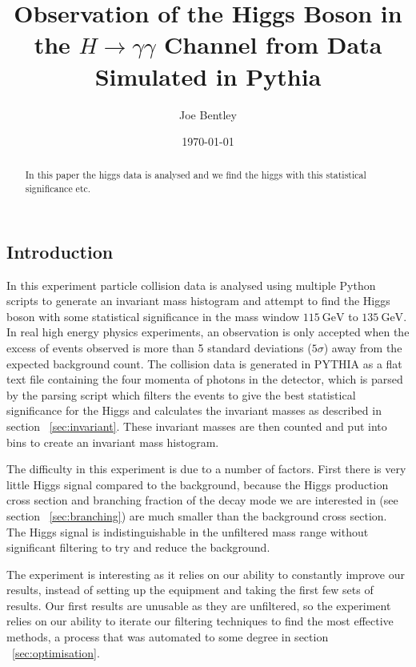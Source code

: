 \documentclass[11pt]{amsart}
\title{Observation of the Higgs Boson in the $H \to \gamma\gamma$ Channel from Data Simulated in Pythia}
\author{Joe Bentley}
\date{\today}
\begin{document}
\begin{abstract}
  In this paper the higgs data is analysed and we find the higgs with this statistical significance etc.
\end{abstract}

\maketitle

\newpage

\pagestyle{fancyplain}


\begin{multicols}{2}

\section{Introduction}

In this experiment particle collision data is analysed using multiple Python scripts to generate an invariant mass histogram and attempt to find the Higgs boson with some statistical significance in the mass window $\SI{115}{\giga\electronvolt}$ to $\SI{135}{\giga\electronvolt}$. In real high energy physics experiments, an observation is only accepted when the excess of events observed is more than 5 standard deviations ($5\sigma$) away from the expected background count. \cite{5sigma} The collision data is generated in PYTHIA as a flat text file containing the four momenta of photons in the detector, which is parsed by the parsing script which filters the events to give the best statistical significance for the Higgs and calculates the invariant masses as described in section ~\ref{sec:invariant}. These invariant masses are then counted and put into bins to create an invariant mass histogram.

The difficulty in this experiment is due to a number of factors. First there is very little Higgs signal compared to the background, because the Higgs production cross section and branching fraction of the decay mode we are interested in (see section ~\ref{sec:branching}) are much smaller than the background cross section. The Higgs signal is indistinguishable in the unfiltered mass range without significant filtering to try and reduce the background.

The experiment is interesting as it relies on our ability to constantly improve our results, instead of setting up the equipment and taking the first few sets of results. Our first results are unusable as they are unfiltered, so the experiment relies on our ability to iterate our filtering techniques to find the most effective methods, a process that was automated to some degree in section ~\ref{sec:optimisation}.


\end{multicols}
\end{document}
